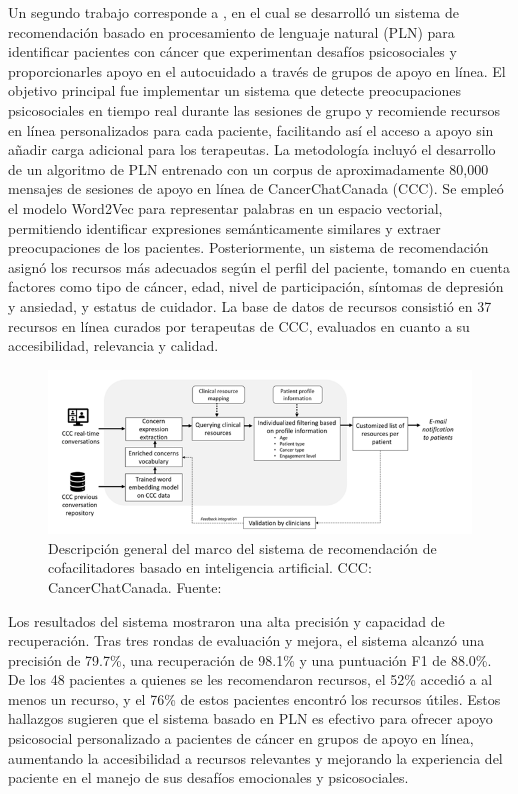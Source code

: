 Un segundo trabajo corresponde a \parencite{leung2022}, en el cual se desarrolló un sistema de recomendación basado en procesamiento de lenguaje natural (PLN) para identificar pacientes con cáncer que experimentan desafíos psicosociales y proporcionarles apoyo en el autocuidado a través de grupos de apoyo en línea. El objetivo principal fue implementar un sistema que detecte preocupaciones psicosociales en tiempo real durante las sesiones de grupo y recomiende recursos en línea personalizados para cada paciente, facilitando así el acceso a apoyo sin añadir carga adicional para los terapeutas.
La metodología incluyó el desarrollo de un algoritmo de PLN entrenado con un corpus de aproximadamente 80,000 mensajes de sesiones de apoyo en línea de CancerChatCanada (CCC). Se empleó el modelo Word2Vec para representar palabras en un espacio vectorial, permitiendo identificar expresiones semánticamente similares y extraer preocupaciones de los pacientes. Posteriormente, un sistema de recomendación asignó los recursos más adecuados según el perfil del paciente, tomando en cuenta factores como tipo de cáncer, edad, nivel de participación, síntomas de depresión y ansiedad, y estatus de cuidador. La base de datos de recursos consistió en 37 recursos en línea curados por terapeutas de CCC, evaluados en cuanto a su accesibilidad, relevancia y calidad.
\begin{figure}[ht]
	\centering
	\includegraphics[width=\textwidth]{2/figures/CANADA.png}
	\caption{Descripción general del marco del sistema de recomendación de cofacilitadores basado en inteligencia artificial. CCC: CancerChatCanada. Fuente: \cite{leung2022}}
	\label{9:fig}
\end{figure}

Los resultados del sistema mostraron una alta precisión y capacidad de recuperación. Tras tres rondas de evaluación y mejora, el sistema alcanzó una precisión de 79.7\%, una recuperación de 98.1\% y una puntuación F1 de 88.0\%. De los 48 pacientes a quienes se les recomendaron recursos, el 52\% accedió a al menos un recurso, y el 76\% de estos pacientes encontró los recursos útiles. Estos hallazgos sugieren que el sistema basado en PLN es efectivo para ofrecer apoyo psicosocial personalizado a pacientes de cáncer en grupos de apoyo en línea, aumentando la accesibilidad a recursos relevantes y mejorando la experiencia del paciente en el manejo de sus desafíos emocionales y psicosociales.

